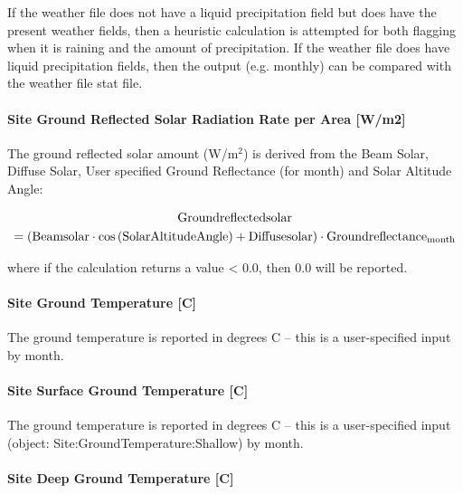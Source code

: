 If the weather file does not have a liquid precipitation field but does have the present weather fields, then a heuristic calculation is attempted for both flagging when it is raining and the amount of precipitation. If the weather file does have liquid precipitation fields, then the output (e.g. monthly) can be compared with the weather file stat file.

\paragraph{Site Ground Reflected Solar Radiation Rate per Area {[}W/m2{]}}\label{site-ground-reflected-solar-radiation-rate-per-area-wm2}

The ground reflected solar amount (W/m\(^{2}\)) is derived from the Beam Solar, Diffuse Solar, User specified Ground Reflectance (for month) and Solar Altitude Angle:

\begin{multline}
  \rm{Groundreflectedsolar}
  \\
  = \left( \rm{Beamsolar} \cdot cos \left( \rm{SolarAltitudeAngle} \right) + \rm{Diffusesolar} \right) \cdot \rm{Groundreflectance}_{\rm{month}}
\end{multline}

where if the calculation returns a value \textless{} 0.0, then 0.0 will be reported.

\paragraph{Site Ground Temperature {[}C{]}}\label{site-ground-temperature-c}

The ground temperature is reported in degrees C -- this is a user-specified input by month.

\paragraph{Site Surface Ground Temperature {[}C{]}}\label{site-surface-ground-temperature-c}

The ground temperature is reported in degrees C -- this is a user-specified input (object: Site:GroundTemperature:Shallow) by month.

\paragraph{Site Deep Ground Temperature {[}C{]}}\label{site-deep-ground-temperature-c}

